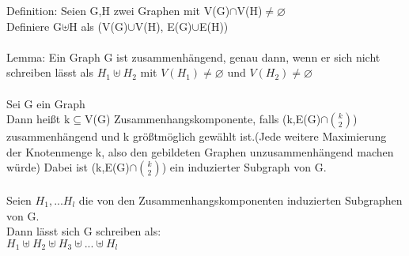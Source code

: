 \documentclass{scrartcl}
\begin{document}
	Definition: Seien G,H zwei Graphen mit V(G)$\cap$V(H)$\neq\varnothing$\\
	Definiere G$\uplus$H als (V(G)$\cup$V(H), E(G)$\cup$E(H))\\\\
	Lemma: Ein Graph G ist zusammenhängend, genau dann, wenn er sich nicht schreiben lässt als $H_1\uplus H_2$ mit $V(H_1)\neq \varnothing$ und $V(H_2)\neq \varnothing$\\\\
	Sei G ein Graph\\
	Dann heißt k$\subseteq$V(G) Zusammenhangskomponente, falls (k,E(G)$\cap$$\binom{k}{2}$) zusammenhängend und k größtmöglich gewählt ist.(Jede weitere Maximierung der Knotenmenge k, also den gebildeten Graphen unzusammenhängend machen würde) Dabei ist (k,E(G)$\cap$$\binom{k}{2}$) ein induzierter Subgraph von G.\\\\
	Seien $H_1,...H_l$ die von den Zusammenhangskomponenten induzierten Subgraphen von G.\\
	Dann lässt sich G schreiben als:\\
	$H_1\uplus H_2\uplus H_3\uplus...\uplus H_l$
\end{document}
